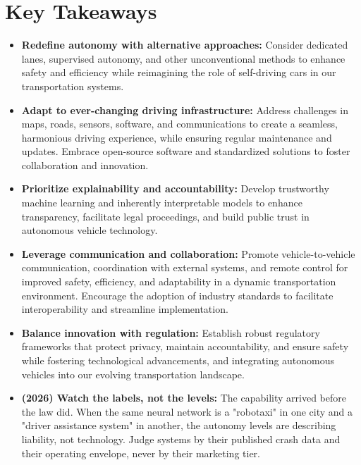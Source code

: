 \section{Key Takeaways}

\begin{itemize}
\item \textbf{Redefine autonomy with alternative approaches:} Consider dedicated lanes, supervised autonomy, and other unconventional methods to enhance safety and efficiency while reimagining the role of self-driving cars in our transportation systems.
\item \textbf{Adapt to ever-changing driving infrastructure:} Address challenges in maps, roads, sensors, software, and communications to create a seamless, harmonious driving experience, while ensuring regular maintenance and updates. Embrace open-source software and standardized solutions to foster collaboration and innovation.
\item \textbf{Prioritize explainability and accountability:} Develop trustworthy machine learning and inherently interpretable models to enhance transparency, facilitate legal proceedings, and build public trust in autonomous vehicle technology.
\item \textbf{Leverage communication and collaboration:} Promote vehicle-to-vehicle communication, coordination with external systems, and remote control for improved safety, efficiency, and adaptability in a dynamic transportation environment. Encourage the adoption of industry standards to facilitate interoperability and streamline implementation.
\item \textbf{Balance innovation with regulation:} Establish robust regulatory frameworks that protect privacy, maintain accountability, and ensure safety while fostering technological advancements, and integrating autonomous vehicles into our evolving transportation landscape.
\item \textbf{(2026) Watch the labels, not the levels:} The capability arrived before the law did. When the same neural network is a "robotaxi" in one city and a "driver assistance system" in another, the autonomy levels are describing liability, not technology. Judge systems by their published crash data and their operating envelope, never by their marketing tier.
\end{itemize}
